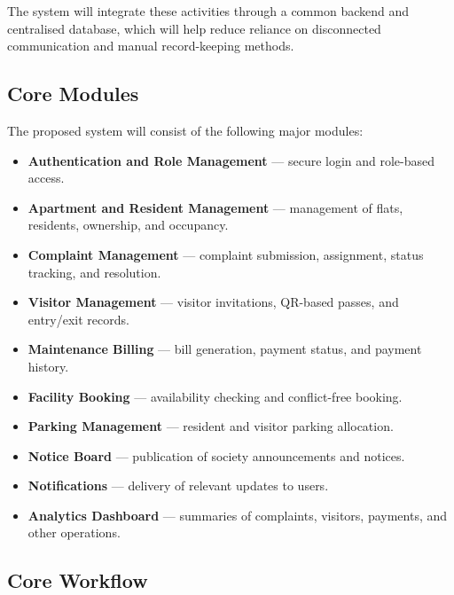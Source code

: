 \documentclass[11pt,a4paper]{article}
\begin{document}
The system will integrate these activities through a common backend and centralised database, which will help reduce reliance on disconnected communication and manual record-keeping methods.

\subsection{Core Modules}

The proposed system will consist of the following major modules:

\begin{itemize}

    \item \textbf{Authentication and Role Management} --- secure login and role-based access.

    \item \textbf{Apartment and Resident Management} --- management of flats, residents, ownership, and occupancy.

    \item \textbf{Complaint Management} --- complaint submission, assignment, status tracking, and resolution.

    \item \textbf{Visitor Management} --- visitor invitations, QR-based passes, and entry/exit records.

    \item \textbf{Maintenance Billing} --- bill generation, payment status, and payment history.

    \item \textbf{Facility Booking} --- availability checking and conflict-free booking.

    \item \textbf{Parking Management} --- resident and visitor parking allocation.

    \item \textbf{Notice Board} --- publication of society announcements and notices.

    \item \textbf{Notifications} --- delivery of relevant updates to users.

    \item \textbf{Analytics Dashboard} --- summaries of complaints, visitors, payments, and other operations.

\end{itemize}

\subsection{Core Workflow}
\end{document}
